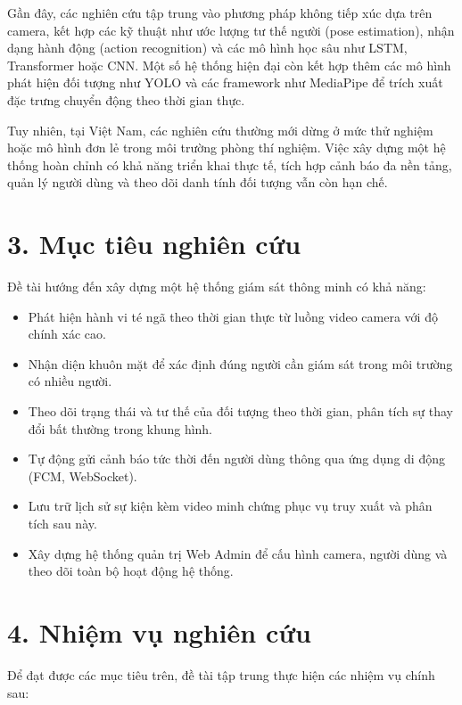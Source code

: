 Gần đây, các nghiên cứu tập trung vào phương pháp không tiếp xúc dựa trên camera, kết hợp các kỹ thuật như ước lượng tư thế người (pose estimation), nhận dạng hành động (action recognition) và các mô hình học sâu như LSTM, Transformer hoặc CNN. Một số hệ thống hiện đại còn kết hợp thêm các mô hình phát hiện đối tượng như YOLO và các framework như MediaPipe để trích xuất đặc trưng chuyển động theo thời gian thực.

Tuy nhiên, tại Việt Nam, các nghiên cứu thường mới dừng ở mức thử nghiệm hoặc mô hình đơn lẻ trong môi trường phòng thí nghiệm. Việc xây dựng một hệ thống hoàn chỉnh có khả năng triển khai thực tế, tích hợp cảnh báo đa nền tảng, quản lý người dùng và theo dõi danh tính đối tượng vẫn còn hạn chế.

\section*{3. Mục tiêu nghiên cứu}

Đề tài hướng đến xây dựng một hệ thống giám sát thông minh có khả năng:

\begin{itemize}
    \item Phát hiện hành vi té ngã theo thời gian thực từ luồng video camera với độ chính xác cao.
    \item Nhận diện khuôn mặt để xác định đúng người cần giám sát trong môi trường có nhiều người.
    \item Theo dõi trạng thái và tư thế của đối tượng theo thời gian, phân tích sự thay đổi bất thường trong khung hình.
    \item Tự động gửi cảnh báo tức thời đến người dùng thông qua ứng dụng di động (FCM, WebSocket).
    \item Lưu trữ lịch sử sự kiện kèm video minh chứng phục vụ truy xuất và phân tích sau này.
    \item Xây dựng hệ thống quản trị Web Admin để cấu hình camera, người dùng và theo dõi toàn bộ hoạt động hệ thống.
\end{itemize}

\section*{4. Nhiệm vụ nghiên cứu}

Để đạt được các mục tiêu trên, đề tài tập trung thực hiện các nhiệm vụ chính sau:

